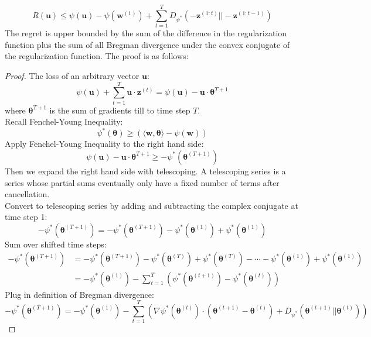 \documentclass[11pt]{article}
\begin{document}
\begin{equation*}
    R(\bm{u}) \leq \psi(\bm{u}) - \psi(\bm{w}^{(1)}) + \sum_{t=1}^{T} D_{\psi^*}(-\bm{z}^{(1:t)}||-\bm{z}^{(1:t-1)})
\end{equation*}
The regret is upper bounded by the sum of the difference in the regularization function plus the sum of all Bregman divergence under the convex conjugate of the regularization function. The proof is as follows:

\begin{proof}
The loss of an arbitrary vector $\bm{u}$:
\begin{equation*}
    \psi(\bm{u}) + \sum_{t=1}^{T} \bm{u} \cdot \bm{z}^{(t)} = \psi(\bm{u}) - \bm{u} \cdot \bm{\theta}^{T+1}
\end{equation*}
where $\bm{\theta}^{T+1}$ is the sum of gradients till to time step $T$.\\[3pt]
Recall Fenchel-Young Inequality:
\begin{equation*}
    \psi^* (\bm{\theta}) \geq (\langle \bm{w}, \bm{\theta} \rangle - \psi(\bm{w}))
\end{equation*}
Apply Fenchel-Young Inequality to the right hand side:
\begin{equation*}
    \psi(\bm{u}) - \bm{u} \cdot \bm{\theta}^{T+1} \geq -\psi^*(\bm{\theta}^{(T+1)})
\end{equation*}
Then we expand the right hand side with telescoping. A telescoping series is a series whose partial sums eventually only have a fixed number of terms after cancellation.\\[3pt]
Convert to telescoping series by adding and subtracting the complex conjugate at time step 1:
\begin{equation*}
    -\psi^*(\bm{\theta}^{(T+1)}) = -\psi^*(\bm{\theta}^{(T+1)})  -\psi^*(\bm{\theta}^{(1)}) + \psi^*(\bm{\theta}^{(1)})
\end{equation*}
Sum over shifted time steps:
\begin{equation*}
\begin{aligned}
    -\psi^*(\bm{\theta}^{(T+1)}) &= -\psi^*(\bm{\theta}^{(T+1)}) - \psi^*(\bm{\theta}^{(T)}) + \psi^*(\bm{\theta}^{(T)}) - \cdots -\psi^*(\bm{\theta}^{(1)}) + \psi^*(\bm{\theta}^{(1)})\\
    &= -\psi^*(\bm{\theta}^{(1)}) - \sum_{t=1}^T (\psi^*(\bm{\theta}^{(t+1)}) - \psi^*(\bm{\theta}^{(t)}))
    \end{aligned}
\end{equation*}
Plug in definition of Bregman divergence:
\begin{equation*}
    -\psi^*(\bm{\theta}^{(T+1)}) = -\psi^*(\bm{\theta}^{(1)}) - \sum_{t=1}^T \left( \nabla \psi^*(\bm{\theta}^{(t)}) \cdot (\bm{\theta}^{(t+1)} - \bm{\theta}^{(t)}) +  D_{\psi^*}(\bm{\theta}^{(t+1)}||\bm{\theta}^{(t)})\right)
\end{equation*}


\end{proof}
\end{document}
